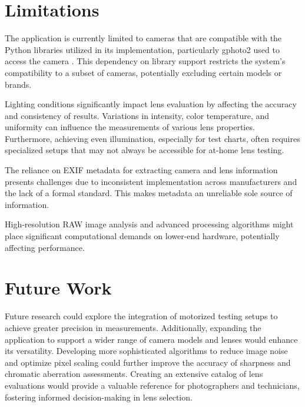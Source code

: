\section{Limitations}
The application is currently limited to cameras that are compatible with the Python libraries utilized in its implementation, particularly gphoto2 used to access the camera \cite{gphoto2_compatible}. This dependency on library support restricts the system’s compatibility to a subset of cameras, potentially excluding certain models or brands.

Lighting conditions significantly impact lens evaluation by affecting the accuracy and consistency of results. Variations in intensity, color temperature, and uniformity can influence the measurements of various lens properties. Furthermore, achieving even illumination, especially for test charts, often requires specialized setups that may not always be accessible for at-home lens testing.

The reliance on EXIF metadata for extracting camera and lens information presents challenges due to inconsistent implementation across manufacturers and the lack of a formal standard. This makes metadata an unreliable sole source of information.

High-resolution RAW image analysis and advanced processing algorithms might place significant computational demands on lower-end hardware, potentially affecting performance.

\section{Future Work}

Future research could explore the integration of motorized testing setups to achieve greater precision in measurements. Additionally, expanding the application to support a wider range of camera models and lenses would enhance its versatility. Developing more sophisticated algorithms to reduce image noise and optimize pixel scaling could further improve the accuracy of sharpness and chromatic aberration assessments. Creating an extensive catalog of lens evaluations would provide a valuable reference for photographers and technicians, fostering informed decision-making in lens selection.


